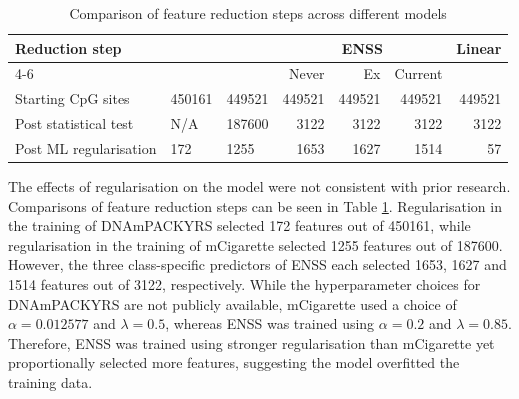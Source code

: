 \documentclass{article} %
\begin{document}
\begin{table}[p]
    \caption{Comparison of feature reduction steps across different models} \label{table:sites-used}
    \begin{tabularx}{\textwidth}{l >{\raggedleft\arraybackslash}X >{\raggedleft\arraybackslash}X r r r r}
        \toprule
        \multirow{2}{*}{\textbf{Reduction step}} & \multirow{2}{*}{\textbf{DNAmPY}} & \multirow{2}{*}{\textbf{mCigarette}} & \multicolumn{3}{c}{\textbf{ENSS}} & \multirow{2}{*}{\textbf{Linear}}                               \\
        \cmidrule(lr){4-6}
                                                 &                                  &                                      & Never                             & Ex                               & Current      &              \\
        \midrule
        Starting CpG sites                       & \num{450161}                     & \num{449521}                         & \num{449521}                      & \num{449521}                     & \num{449521} & \num{449521} \\
        \addlinespace
        Post statistical test                    & N/A                              & \num{187600}                         & \num{3122}                        & \num{3122}                       & \num{3122}   & \num{3122}   \\
        \addlinespace
        Post ML regularisation                   & \num{172}                        & \num{1255}                           & \num{1653}                        & \num{1627}                       & \num{1514}   & \num{57}     \\
        \bottomrule
    \end{tabularx}
\end{table}

The effects of regularisation on the model were not consistent with prior research. Comparisons of feature reduction steps can be seen in Table \ref{table:sites-used}. Regularisation in the training of DNAmPACKYRS selected 172 features out of \num{450161}, while regularisation in the training of mCigarette selected \num{1255} features out of \num{187600}. However, the three class-specific predictors of ENSS each selected 1653, 1627 and 1514 features out of 3122, respectively. While the hyperparameter choices for DNAmPACKYRS are not publicly available, mCigarette used a choice of \(\alpha = 0.012577\) and \(\lambda = 0.5\), whereas ENSS was trained using \(\alpha = 0.2\) and \(\lambda = 0.85\). Therefore, ENSS was trained using stronger regularisation than mCigarette yet proportionally selected more features, suggesting the model overfitted the training data.
\end{document}
